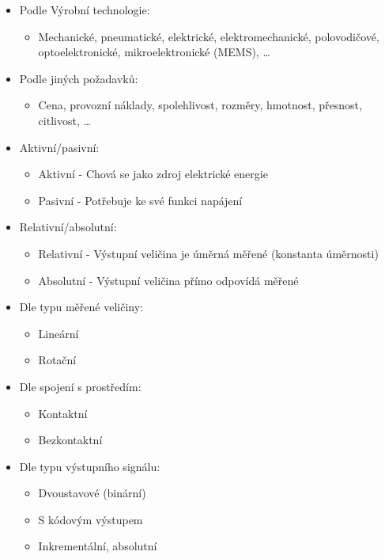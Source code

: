 \begin{itemize}
\begin{itemize}
  \end{itemize}
  \item Podle Výrobní technologie: \begin{itemize}
    \item Mechanické, pneumatické, elektrické, elektromechanické, polovodičové, optoelektronické, mikroelektronické (MEMS), \dots
  \end{itemize}
  \item Podle jiných požadavků: \begin{itemize}
    \item Cena, provozní náklady, spolehlivost, rozměry, hmotnost, přesnost, citlivost, \dots
  \end{itemize}
    \item Aktivní/pasivní:\begin{itemize}
              \item Aktivní - Chová se jako zdroj elektrické energie
              \item Pasivní - Potřebuje ke své funkci napájení
          \end{itemize}
    \item Relativní/absolutní: \begin{itemize}
              \item Relativní - Výstupní veličina je úměrná měřené (konstanta úměrnosti)
              \item Absolutní - Výstupní veličina přímo odpovídá měřené
          \end{itemize}
    \item Dle typu měřené veličiny: \begin{itemize}
              \item Lineární
              \item Rotační
          \end{itemize}
    \item Dle spojení s prostředím: \begin{itemize}
              \item Kontaktní
              \item Bezkontaktní
          \end{itemize}
    \item Dle typu výstupního signálu: \begin{itemize}
              \item Dvoustavové (binární)
              \item S kódovým výstupem
              \item Inkrementální, absolutní

\end{itemize}
\end{itemize}
